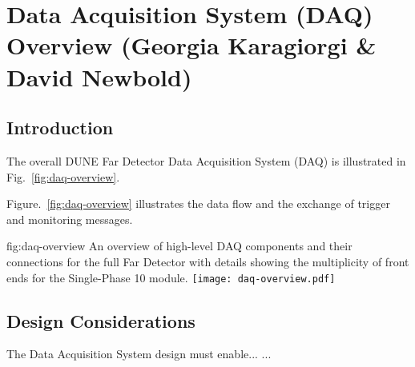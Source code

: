 \section{Data Acquisition System (DAQ) Overview (Georgia Karagiorgi \& David Newbold)}
\label{sec:fdsp-daq-ov}


\subsection{Introduction}
\label{sec:fdsp-daq-intro}

The overall DUNE Far Detector Data Acquisition System (DAQ) is
illustrated in Fig.~\ref{fig:daq-overview}.

Figure.~\ref{fig:daq-overview} illustrates the data flow and the
exchange of trigger and monitoring messages.



\begin{dunefigure}{fig:daq-overview}
  {An overview of high-level DAQ components and their connections for the full Far Detector with details showing the multiplicity of front ends for the Single-Phase \SI{10}{\kton} module.}
\texttt{[image: daq-overview.pdf]}%
\end{dunefigure}



\subsection{Design Considerations}
\label{sec:fdsp-daq-des-consid}




The Data Acquisition System design must enable... 
...


